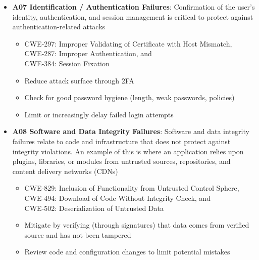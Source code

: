 \documentclass[11pt]{article}
\begin{document}
\begin{itemize}
		\begin{itemize}
			\item CWE-1104: Use of Unmaintained Third-Party Components
			\item Minimize attack surface by removing or disabling unused components
			\item Track inventory of software and follow upstream security notices
			\item Monitor for available patches, if patching is not possible mitigate through firewall or high-level interception
		\end{itemize}
	\item \textbf{A07 Identification / Authentication Failures}: Confirmation of the user's identity, authentication, and session management is critical to protect against authentication-related attacks
		\begin{itemize}
			\item CWE-297: Improper Validating of Certificate with Host Mismatch, \\
			  CWE-287: Improper Authentication, and \\
			  CWE-384: Session Fixation
			\item Reduce attack surface through 2FA
			\item Check for good password hygiene (length, weak passwords, policies)
			\item Limit or increasingly delay failed login attempts
		\end{itemize}
	\item \textbf{A08 Software and Data Integrity Failures}: Software and data integrity failures relate to code and infrastructure that does not protect against integrity violations. An example of this is where an application relies upon plugins, libraries, or modules from untrusted sources, repositories, and content delivery networks (CDNs)
		\begin{itemize}
			\item CWE-829: Inclusion of Functionality from Untrusted Control Sphere, \\
			  CWE-494: Download of Code Without Integrity Check, and \\
			  CWE-502: Deserialization of Untrusted Data
			\item Mitigate by verifying (through signatures) that data comes from verified source and has not been tampered
			\item Review code and configuration changes to limit potential mistakes
		\end{itemize}

\end{itemize}
\end{document}
